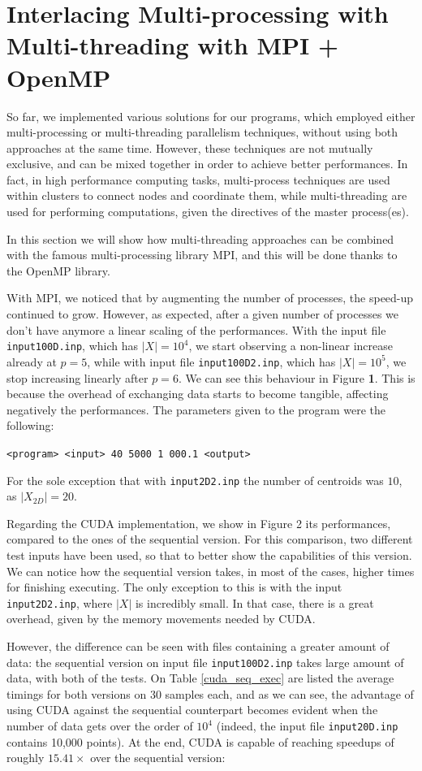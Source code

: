 \documentclass[11pt, journal]{IEEEtran}
\newcommand{\nwl}{

\vspace{11pt}

}
\begin{document}
\section{Interlacing Multi-processing with Multi-threading with MPI + OpenMP}

So far, we implemented various solutions for our programs, which employed either multi-processing or multi-threading parallelism techniques, without using both approaches at the same time. However, these techniques are not mutually exclusive, and can be mixed together in order to achieve better performances. In fact, in high performance computing tasks, multi-process techniques are used within clusters to connect nodes and coordinate them, while multi-threading are used for performing computations, given the directives of the master process(es).
\nwl
In this section we will show how multi-threading approaches can be combined with the famous multi-processing library MPI, and this will be done thanks to the OpenMP library.


With MPI, we noticed that by augmenting the number of processes, the speed-up continued to grow. However, as expected, after a given number of processes we don't have anymore a linear scaling of the performances. With the input file \verb|input100D.inp|, which has $|X| = 10^4$, we start observing a non-linear increase already at $p = 5$, while with input file \verb|input100D2.inp|, which has $|X| = 10^5$, we stop increasing linearly after $p = 6$. We can see this behaviour in Figure \textbf{1}. This is because the overhead of exchanging data starts to become tangible, affecting negatively the performances. The parameters given to the program were the following:

\begin{center}
    \footnotesize
    \verb|<program> <input> 40 5000 1 000.1 <output>|
\end{center}

For the sole exception that with \verb|input2D2.inp| the number of centroids was $10$, as $|X_{2D}| = 20$.

Regarding the CUDA implementation, we show in Figure 2 its performances, compared to the ones of the sequential version. For this comparison, two different test inputs have been used, so that to better show the capabilities of this version. We can notice how the sequential version takes, in most of the cases, higher times for finishing executing. The only exception to this is with the input \verb|input2D2.inp|, where $|X|$ is incredibly small. In that case, there is a great overhead, given by the memory movements needed by CUDA.
\nwl
However, the difference can be seen with files containing a greater amount of data: the sequential version on input file \verb|input100D2.inp| takes large amount of data, with both of the tests. On Table \ref{cuda_seq_exec} are listed the average timings for both versions on 30 samples each, and as we can see, the advantage of using CUDA against the sequential counterpart becomes evident when the number of data gets over the order of $10^4$ (indeed, the input file \verb|input20D.inp| contains 10,000 points). At the end, CUDA is capable of reaching speedups of roughly $15.41\times$ over the sequential version:
\end{document}
